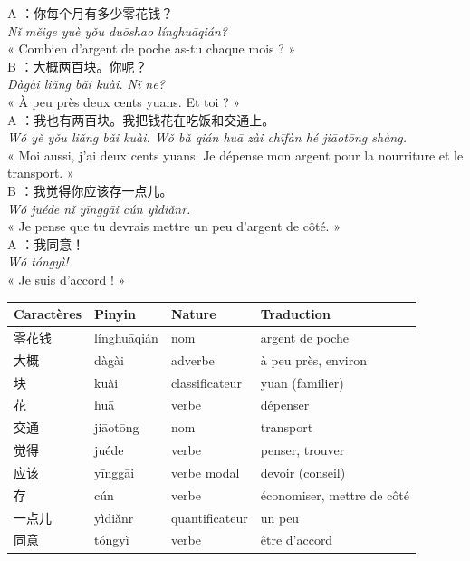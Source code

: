 \documentclass[11pt]{article}
\begin{document}
\begin{textebox}
A ：你每个月有多少零花钱？\\
\emph{Nǐ měige yuè yǒu duōshao línghuāqián?}\\
« Combien d'argent de poche as-tu chaque mois ? »\\[4pt]
B ：大概两百块。你呢？\\
\emph{Dàgài liǎng bǎi kuài. Nǐ ne?}\\
« À peu près deux cents yuans. Et toi ? »\\[4pt]
A ：我也有两百块。我把钱花在吃饭和交通上。\\
\emph{Wǒ yě yǒu liǎng bǎi kuài. Wǒ bǎ qián huā zài chīfàn hé jiāotōng shàng.}\\
« Moi aussi, j'ai deux cents yuans. Je dépense mon argent pour la nourriture et le transport. »\\[4pt]
B ：我觉得你应该存一点儿。\\
\emph{Wǒ juéde nǐ yīnggāi cún yìdiǎnr.}\\
« Je pense que tu devrais mettre un peu d'argent de côté. »\\[4pt]
A ：我同意！\\
\emph{Wǒ tóngyì!}\\
« Je suis d'accord ! »
\end{textebox}

\begin{center}
\begin{tabularx}{\linewidth}{|X|X|X|X|}
\hline
\rowcolor{popblueL} Caractères & Pinyin & Nature & Traduction \\
\hline
零花钱 & línghuāqián & nom & argent de poche \\
\hline
大概 & dàgài & adverbe & à peu près, environ \\
\hline
块 & kuài & classificateur & yuan (familier) \\
\hline
花 & huā & verbe & dépenser \\
\hline
交通 & jiāotōng & nom & transport \\
\hline
觉得 & juéde & verbe & penser, trouver \\
\hline
应该 & yīnggāi & verbe modal & devoir (conseil) \\
\hline
存 & cún & verbe & économiser, mettre de côté \\
\hline
一点儿 & yìdiǎnr & quantificateur & un peu \\
\hline
同意 & tóngyì & verbe & être d'accord \\
\hline
\end{tabularx}
\end{center}
\end{document}
